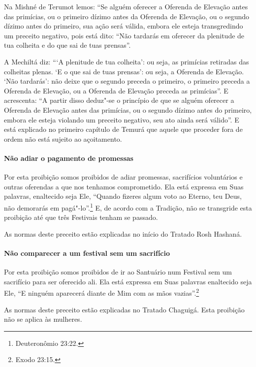 \begin{multicols}{2}
Na Mishné de Terumot\starr{} lemos: ``Se alguém oferecer a Oferenda de Elevação
antes das primícias, ou o primeiro dízimo antes da Oferenda de
Elevação, ou o segundo dízimo antes do primeiro, sua ação será válida,
embora ele esteja transgredindo um preceito negativo, pois está dito:
``Não tardarás em oferecer da plenitude de tua colheita e do que sai de
tuas prensas''.

A Mechiltá\starr{} diz: ```A plenitude de tua colheita': ou seja, as primícias
retiradas das colheitas plenas. `E o que sai de tuas prensas': ou seja,
a Oferenda de Elevação. `Não tardarás': não deixe que o segundo preceda
o primeiro, o primeiro preceda a Oferenda de Elevação, ou a Oferenda de
Elevação preceda as primícias''. E acrescenta: ``A partir disso deduz"-se
o princípio de que se alguém oferecer a Oferenda de Elevação antes das
primícias, ou o segundo dízimo antes do primeiro, embora ele esteja
violando um preceito negativo, seu ato ainda será válido''. E está
explicado no primeiro capítulo de Temurá\starr{} que aquele que proceder fora de
ordem não está sujeito ao açoitamento.

\paragraph{Não adiar o pagamento de promessas}

Por esta proibição somos proibidos de adiar promessas, sacrifícios
voluntários e outras oferendas a que nos tenhamos comprometido. Ela está
expressa em Suas palavras, enaltecido seja Ele, ``Quando fizeres algum
voto ao Eterno, teu Deus, não demorarás em pagá"-lo''.\footnote{Deuteronômio 23:22.} E, de acordo com a Tradição, não se transgride
esta proibição até que três Festivais tenham se passado.

As normas deste preceito estão explicadas no início do Tratado Rosh Hashaná\starr.

\paragraph{Não comparecer a um festival sem um sacrifício}

Por esta proibição somos proibidos de ir ao Santuário num Festival sem
um sacrifício para ser oferecido ali. Ela está expressa em Suas palavras
enaltecido seja Ele, ``E ninguém aparecerá diante de Mim com as mãos
vazias''.\footnote{Exodo 23:15.}

As normas deste preceito estão explicadas no Tratado Chaguigá\starr. Esta
proibição não se aplica às mulheres.


\end{multicols}

